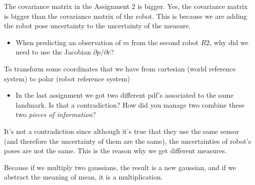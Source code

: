 \documentclass[11pt]{article}
\providecommand{\tightlist}{%
      \setlength{\itemsep}{0pt}\setlength{\parskip}{0pt}}
\begin{document}
The covariance matrix in the Assignment 2 is bigger. Yes, the covariance
matrix is bigger than the covariance matrix of the robot. This is
because we are adding the robot pose uncertainty to the uncertainty of
the measure.

\begin{itemize}
\tightlist
\item
  When predicting an observation of \(m\) from the second robot \(R2\),
  why did we need to use the Jacobian \({\partial{p}}/{\partial{c}}\)?
\end{itemize}

To transform some coordinates that we have from cartesian (world
reference system) to polar (robot reference system)

\begin{itemize}
\tightlist
\item
  In the last assignment we got two different pdf's associated to the
  same landmark. Is that a contradiction? How did you manage two combine
  these two \emph{pieces of information}?
\end{itemize}

It's not a contradiction since although it's true that they use the same
sensor (and therefore the uncertainty of them are the same), the
uncertainties of robot's poses are not the same. This is the reason why
we get different measures.

Because if we multiply two gaussians, the result is a new gaussian, and
if we abstract the meaning of mean, it is a multiplication.


    
    
    
\end{document}
